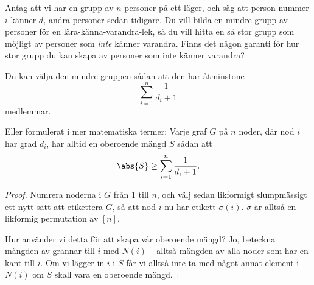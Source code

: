 \documentclass[nobib]{tufte-handout}
\begin{document}
Antag att vi har en grupp av $n$ personer på ett läger, och säg att person nummer $i$ känner $d_i$ andra personer sedan tidigare. Du vill bilda en mindre grupp av personer för en lära-känna-varandra-lek, så du vill hitta en så stor grupp som möjligt av personer som \emph{inte} känner varandra. Finns det någon garanti för hur stor grupp du kan skapa av personer som inte känner varandra?

\begin{theorem}
    Du kan välja den mindre gruppen sådan att den har åtminstone
    $$\sum_{i=1}^{n} \frac{1}{d_i + 1}$$
    medlemmar.

    Eller formulerat i mer matematiska termer: Varje graf $G$ på $n$ noder, där nod $i$ har grad $d_i$, har alltid en oberoende mängd 
    $S$ sådan att
    $$\abs{S} \geq \sum_{i=1}^{n} \frac{1}{d_i + 1}.$$

    \begin{proof}
        Numrera noderna i $G$ från $1$ till $n$, och välj sedan likformigt slumpmässigt ett nytt sätt att etikettera $G$, så att nod $i$ nu har etikett $\sigma(i)$. $\sigma$ är alltså en likformig permutation av $[n]$.

        Hur använder vi detta för att skapa vår oberoende mängd? Jo, beteckna mängden av grannar till $i$ med $N(i)$ -- alltså mängden av alla noder som har en kant till $i$. Om vi lägger in $i$ i $S$ får vi alltså inte ta med något annat element i $N(i)$ om $S$ skall vara en oberoende mängd.


\end{proof}
\end{theorem}
\end{document}
